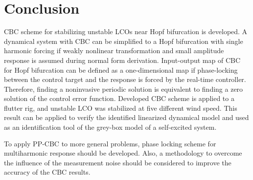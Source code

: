 \documentclass[openacc]{rsproca_new}%
\begin{document}
\section{Conclusion}
CBC scheme for stabilizing unstable LCOs near Hopf bifurcation is developed. A dynamical system with CBC can be simplified to a Hopf bifurcation with single harmonic forcing if weakly nonlinear transformation and small amplitude response is assumed during normal form derivation. Input-output map of CBC for Hopf bifurcation can be defined as a one-dimensional map if phase-locking between the control target and the response is forced by the real-time controller. Therefore, finding a noninvasive periodic solution is equivalent to finding a zero solution of the control error function. Developed CBC scheme is applied to a flutter rig, and unstable LCO was stabilized at five different wind speed. This result can be applied to verify the identified linearized dynamical model and used as an identification tool of the grey-box model of a self-excited system.

To apply PP-CBC to more general problems, phase locking scheme for multiharmonic response should be developed. Also, a methodology to overcome the influence of the measurement noise should be considered to improve the accuracy of the CBC results. \vskip6pt


\enlargethispage{20pt}





\end{document}
